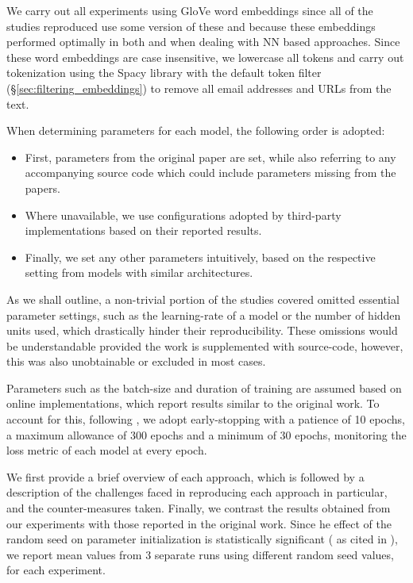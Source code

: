 \documentclass[../../fyp.tex]{subfiles}
\begin{document}
We carry out all experiments using GloVe word embeddings \citep{pennington} since all of the studies reproduced use some version of these and because these embeddings performed optimally in both \citet{moore2018} and \citet{bhuwandhingra2017} when dealing with NN based approaches. Since these word embeddings are case insensitive, we lowercase all tokens and carry out tokenization using the Spacy library with the default token filter (\S\ref{sec:filtering_embeddings}) to remove all email addresses and URLs from the text.

When determining parameters for each model, the following order is adopted: 
\begin{itemize}
	\item First, parameters from the original paper are set, while also referring to any accompanying source code which could include parameters missing from the papers.
	\item Where unavailable, we use configurations adopted by third-party implementations based on their reported results.
	\item Finally, we set any other parameters intuitively, based on the respective setting from models with similar architectures.
\end{itemize}
   
As we shall outline, a non-trivial portion of the studies covered omitted essential parameter settings, such as the learning-rate of a model or the number of hidden units used, which drastically hinder their reproducibility. These omissions would be understandable provided the work is supplemented with source-code, however, this was also unobtainable or excluded in most cases.

Parameters such as the batch-size and duration of training are assumed based on online implementations, which report results similar to the original work. To account for this, following \citet{moore2018}, we adopt early-stopping with a patience of 10 epochs, a maximum allowance of 300 epochs and a minimum of 30 epochs, monitoring the loss metric of each model at every epoch. 

We first provide a brief overview of each approach, which is followed by a description of the challenges faced in reproducing each approach in particular, and the counter-measures taken. Finally, we contrast the results obtained from our experiments with those reported in the original work. Since he effect of the random seed on parameter initialization is statistically significant (\citet{reimers2017} as cited in \citet{moore2018}), we report mean values from 3 separate runs using different random seed values, for each experiment. 
\end{document}

